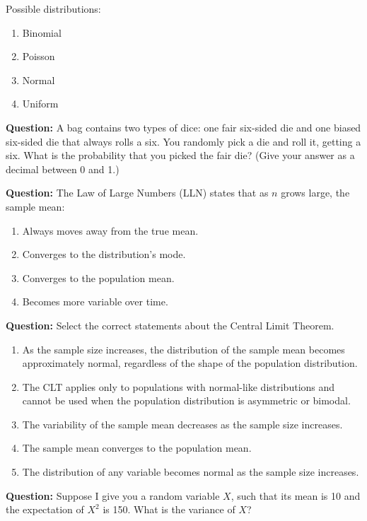 \documentclass[12pt]{article}
\begin{document}
Possible distributions:  
\begin{enumerate}
    \item[(1)] Binomial  
    \item[(2)] Poisson  
    \item[(3)] Normal  
    \item[(4)] Uniform  
\end{enumerate}

\textbf{Question:}  
A bag contains two types of dice: one fair six-sided die and one biased six-sided die that always rolls a six. You randomly pick a die and roll it, getting a six. What is the probability that you picked the fair die? (Give your answer as a decimal between 0 and 1.) 

\textbf{Question:}  
The Law of Large Numbers (LLN) states that as \( n \) grows large, the sample mean:  
\begin{enumerate}
    \item[(A)] Always moves away from the true mean.  
    \item[(B)] Converges to the distribution’s mode.  
    \item[(C)] Converges to the population mean.  
    \item[(D)] Becomes more variable over time.  
\end{enumerate}

\textbf{Question:}  
Select the correct statements about the Central Limit Theorem.

\begin{enumerate}
    \item[(A)] As the sample size increases, the distribution of the sample mean becomes approximately normal, regardless of the shape of the population distribution.  
    \item[(B)] The CLT applies only to populations with normal-like distributions and cannot be used when the population distribution is asymmetric or bimodal.  
    \item[(C)] The variability of the sample mean decreases as the sample size increases.  
    \item[(D)] The sample mean converges to the population mean.  
    \item[(E)] The distribution of any variable becomes normal as the sample size increases.  
\end{enumerate}

\textbf{Question:}  
Suppose I give you a random variable \( X \), such that its mean is 10 and the expectation of \( X^2 \) is 150. What is the variance of \( X \)?
\end{document}

